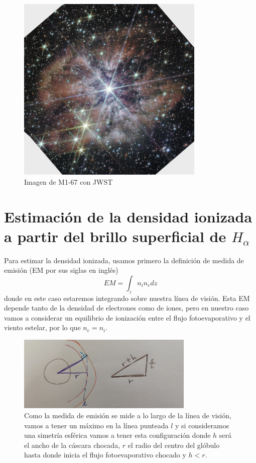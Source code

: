 \documentclass{book}
\begin{document}
\begin{figure}[h]
    \centering
    \includegraphics[width=0.8\textwidth]{M1-67-JWST.jpg}
    \caption{Imagen de M1-67 con JWST}
    \label{fig:M1-67JWST}
\end{figure}

\section{Estimación de la densidad ionizada a partir del brillo superficial de $H_\alpha$}

Para estimar la densidad ionizada, usamos primero la definición de medida de emisión (EM por sus siglas en inglés)
\[EM=\int_z n_i n_edz\] donde en este caso estaremos integrando sobre nuestra línea de visión. Esta EM depende tanto de la densidad de electrones como de iones, pero en nuestro caso vamos a considerar un equilibrio de ionización entre el flujo fotoevaporativo y el viento estelar, por lo que $n_e=n_i$.

\begin{figure}[h]
    \centering    \includegraphics[width=0.75\textwidth]{images Chapter 2/C2_EM.jpg}
    \caption{Como la medida de emisión se mide a lo largo de la línea de visión, vamos a tener un máximo en la línea punteada $l$ y si consideramos una simetría esférica vamos a tener esta configuración donde $h$ será el ancho de la cáscara chocada, $r$ el radio del centro del glóbulo hasta donde inicia el flujo fotoevaporativo chocado y $h<r$.}
    \label{fig:EM}
\end{figure}
\end{document}
